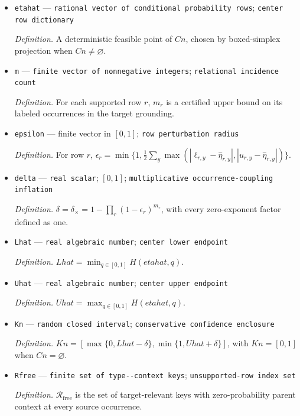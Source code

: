 \documentclass{article}
\begin{document}
\begin{itemize}
  \item \texttt{etahat} --- \texttt{rational vector of conditional probability rows}; \texttt{center row dictionary}
  \par\smallskip\noindent\emph{Definition.} A deterministic feasible point of \(Cn\), chosen by boxed-simplex projection when \(Cn\neq\varnothing\).
  \item \texttt{m} --- \texttt{finite vector of nonnegative integers}; \texttt{relational incidence count}
  \par\smallskip\noindent\emph{Definition.} For each supported row \(r\), \(m_r\) is a certified upper bound on its labeled occurrences in the target grounding.
  \item \texttt{epsilon} --- finite vector in \([0,1]\); \texttt{row perturbation radius}
  \par\smallskip\noindent\emph{Definition.} For row \(r\), \(\epsilon_r=\min\{1,\tfrac12\sum_y\max(|\ell_{r,y}-\widehat\eta_{r,y}|,|u_{r,y}-\widehat\eta_{r,y}|)\}\).
  \item \texttt{delta} --- \texttt{real scalar}; \([0,1]\); \texttt{multiplicative occurrence-\allowbreak{}coupling inflation}
  \par\smallskip\noindent\emph{Definition.} \(\delta=\delta_{\times}=1-\prod_r(1-\epsilon_r)^{m_r}\), with every zero-exponent factor defined as one.
  \item \texttt{Lhat} --- \texttt{real algebraic number}; \texttt{center lower endpoint}
  \par\smallskip\noindent\emph{Definition.} \(Lhat=\min_{q\in[0,1]}H(etahat,q)\).
  \item \texttt{Uhat} --- \texttt{real algebraic number}; \texttt{center upper endpoint}
  \par\smallskip\noindent\emph{Definition.} \(Uhat=\max_{q\in[0,1]}H(etahat,q)\).
  \item \texttt{Kn} --- \texttt{random closed interval}; \texttt{conservative confidence enclosure}
  \par\smallskip\noindent\emph{Definition.} \(Kn=[\max\{0,Lhat-\delta\},\min\{1,Uhat+\delta\}]\), with \(Kn=[0,1]\) when \(Cn=\varnothing\).
  \item \texttt{Rfree} --- \texttt{finite set of type-\allowbreak{}-\allowbreak{}context keys}; \texttt{unsupported-\allowbreak{}row index set}
  \par\smallskip\noindent\emph{Definition.} \(\mathcal R_{\mathrm{free}}\) is the set of target-relevant keys with zero-probability parent context at every source occurrence.

\end{itemize}
\end{document}

